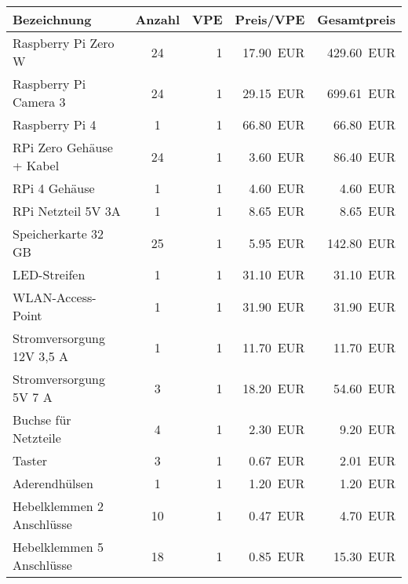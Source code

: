 \documentclass[./00PhotoBox.tex]{subfiles}
\begin{document}
\begin{table}[ht]
    \centering
    \begin{tabular}{l|c|r|r|r}
        Bezeichnung               & Anzahl & \acrshort{VPE} & Preis/\acrshort{VPE} & Gesamtpreis       \\
        \hline
        Raspberry Pi Zero W       & 24     & 1              & \SI{17,90}{EUR}      & \SI{429,60}{EUR}  \\
        Raspberry Pi Camera 3     & 24     & 1              & \SI{29,15}{EUR}      & \SI{699,61}{EUR}  \\
        Raspberry Pi 4            & 1      & 1              & \SI{66,80}{EUR}      & \SI{66,80}{EUR}   \\
        RPi Zero Gehäuse + Kabel  & 24     & 1              & \SI{3,60}{EUR}       & \SI{86,40}{EUR}   \\
        RPi 4 Gehäuse             & 1      & 1              & \SI{4,60}{EUR}       & \SI{4,60}{EUR}    \\
        RPi  Netzteil 5V 3A       & 1      & 1              & \SI{8,65}{EUR}       & \SI{8,65}{EUR}    \\
        Speicherkarte 32 GB       & 25     & 1              & \SI{5,95}{EUR}       & \SI{142,80}{EUR}  \\
        LED-Streifen              & 1      & 1              & \SI{31,10}{EUR}      & \SI{31,10}{EUR}   \\
        WLAN-Access-Point         & 1      & 1              & \SI{31,90}{EUR}      & \SI{31,90}{EUR}   \\
        Stromversorgung 12V 3,5 A & 1      & 1              & \SI{11,70}{EUR}      & \SI{11,70}{EUR}   \\
        Stromversorgung 5V 7 A    & 3      & 1              & \SI{18,20}{EUR}      & \SI{54,60}{EUR}   \\
        Buchse für Netzteile      & 4      & 1              & \SI{2,30}{EUR}       & \SI{9,20}{EUR}    \\
        Taster                    & 3      & 1              & \SI{0,67}{EUR}       & \SI{2,01}{EUR}    \\
        Aderendhülsen             & 1      & 1              & \SI{1,20}{EUR}       & \SI{1,20}{EUR}    \\
        Hebelklemmen 2 Anschlüsse & 10     & 1              & \SI{0,47}{EUR}       & \SI{4,70}{EUR}    \\
        Hebelklemmen 5 Anschlüsse & 18     & 1              & \SI{0,85}{EUR}       & \SI{15,30}{EUR}   \\

\end{tabular}
\end{table}
\end{document}
